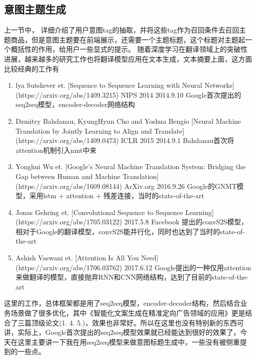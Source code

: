 \subsection{意图主题生成}
上一节中， 详细介绍了用户意图tag的抽取，并将这些tag作为召回条件去召回主题商品，但是意图主题要在前端展示，还需要一个主题标题，这个标题对主题起一个概括性的作用，给用户一些显式的提示。
随着深度学习在翻译领域上的突破性进展，越来越多的研究工作也将翻译模型应用在文本生成，文本摘要上面，这方面比较经典的工作有
\begin{enumerate}
\item lya Sutskever et. [Sequence to Sequence Learning with Neural Networks](https://arxiv.org/abs/1409.3215) NIPS 2014 2014.9.10 
  Google首次提出的seq2seq模型，encoder-decoder网络结构
\item Dzmitry Bahdanau, KyungHyun Cho and Yoshua Bengio [Neural Machine Translation by Jointly Learning to Align and Translate](https://arxiv.org/abs/1409.0473) ICLR 2015 2014.9.1 Bahdanau首次将attention机制引入nmt中来
\item Yonghui Wu et. [Google's Neural Machine Translation System: Bridging the Gap between Human and Machine Translation] (https://arxiv.org/abs/1609.08144) ArXiv.org 2016.9.26 Google的GNMT模型，采用lstm + attention + 残差连接，当时的state-of-the-art
\item Jonas Gehring et. [Convolutional Sequence to Sequence Learning](https://arxiv.org/abs/1705.03122) 2017.5.8 Facebook 提出的convS2S模型，相对于Google的翻译模型，convS2S能并行化，同时也达到了当时的state-of-the-art
\item Ashish Vaswani et. [Attention Is All You Need](https://arxiv.org/abs/1706.03762) 2017.6.12
Google提出的一种仅用attention来做翻译的模型，直接抛弃RNN和CNN网络结构，达到了目前的state-of-the-art
\end{enumerate}
这里的工作，总体框架都是用了seq2seq模型，encoder-decoder结构，然后结合业务场景做了很多优化，其中《智能化文案生成在精准定向广告领域的应用》更是结合了三篇顶级论文(1. 4. 5.)，效果也非常好。所以在这里也没有特别新的东西可讲，实际上，Google首次提出的seq2seq模型效果就已经能达到很好的效果了，今天在这里主要讲一下我在用seq2seq模型来做意图标题生成中，一些没有被侧重提到的一些点。
